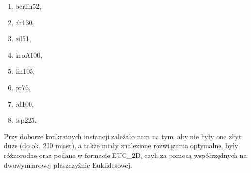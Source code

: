 \begin{enumerate}
    \item berlin52,
    \item ch130,
    \item eil51,
    \item kroA100,
    \item lin105,
    \item pr76,
    \item rd100,
    \item tsp225.
\end{enumerate}

\noindent
Przy doborze konkretnych instancji zależało nam na tym, aby nie były one zbyt duże (do ok. 200 miast), a także miały znalezione rozwiązania optymalne, były różnorodne oraz podane w formacie EUC\_2D, czyli za pomocą współrzędnych na dwuwymiarowej płaszczyźnie Euklidesowej.